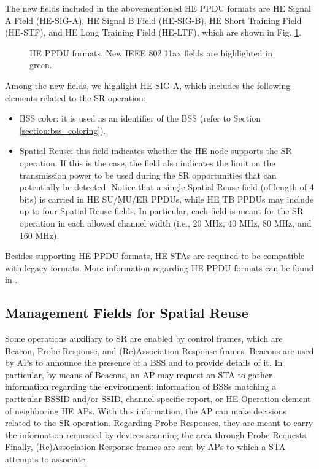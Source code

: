 \documentclass{ieeeaccess}
\begin{document}
The new fields included in the abovementioned HE PPDU formats are HE Signal A Field (HE-SIG-A), HE Signal B Field (HE-SIG-B), HE Short Training Field (HE-STF), and HE Long Training Field (HE-LTF), which are shown in Fig. \ref{fig:appendix_1}.
\begin{figure}[ht!]
	\centering
	\caption{HE PPDU formats. New IEEE 802.11ax fields are highlighted in green.}
	\label{fig:appendix_1}
\end{figure}

Among the new fields, we highlight HE-SIG-A, which includes the following elements related to the SR operation:
\begin{itemize}
	\item BSS color: it is used as an identifier of the BSS (refer to Section \ref{section:bss_coloring}).
	\item Spatial Reuse: this field indicates whether the HE node supports the SR operation. If this is the case, the field also indicates the limit on the transmission power to be used during the SR opportunities that can potentially be detected. Notice that a single Spatial Reuse field (of length of 4 bits) is carried in HE SU/MU/ER PPDUs,  while HE TB PPDUs may include up to four Spatial Reuse fields. In particular, each field is meant for the SR operation in each allowed channel width (i.e., 20 MHz, 40 MHz, 80 MHz, and 160 MHz).
\end{itemize}

Besides supporting HE PPDU formats, HE STAs are required to be compatible with legacy formats. More information regarding HE PPDU formats can be found in \cite{rhode2017whitepaper}. 

\subsection{Management Fields for Spatial Reuse}
Some operations auxiliary to SR are enabled by control frames, which are Beacon, Probe Response, and (Re)Association Response frames. Beacons are used by APs to announce the presence of a BSS and to provide details of it. \textcolor{black}{In particular, by means of Beacons, an AP may request an STA to gather information regarding the environment:} information of BSSs matching a particular BSSID and/or SSID, channel-specific report, or HE Operation element of neighboring HE APs. With this information, the AP can make decisions related to the SR operation. Regarding Probe Responses, they are meant to carry the information requested by devices scanning the area through Probe Requests. Finally, (Re)Association Response frames are sent by APs to which a STA attempts to associate.
\end{document}
